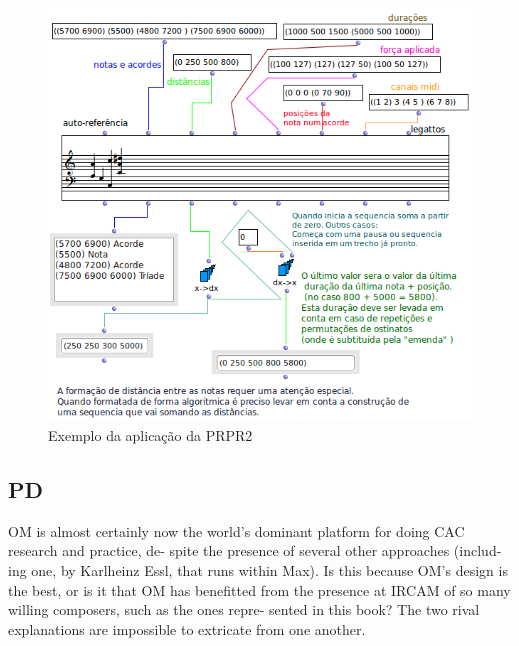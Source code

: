\documentclass[
	12pt,				%
	openright,			%
	twoside,			%
	a4paper,			%
	english,			%
	french,				%
	spanish,			%
	brazil				%
	]{abntex2}
\begin{document}



\begin{figure}[!h]
	\caption{\label{fig_grafico}Exemplo da aplicação da PRPR2}
	\begin{center}
	    \includegraphics[scale=0.5]{OMPD/chord-seq-sem-titulo.png}
	\end{center}
\end{figure}





\subsection{PD}

OM is almost certainly now the world’s dominant
platform for doing CAC research and practice, de-
spite the presence of several other approaches (includ-
ing one, by Karlheinz Essl, that runs within Max).
Is this because OM’s design is the best, or is it that
OM has benefitted from the presence at IRCAM of
so many willing composers, such as the ones repre-
sented in this book? The two rival explanations are
impossible to extricate from one another.
\cite{puckettecomputing}
\end{document}
